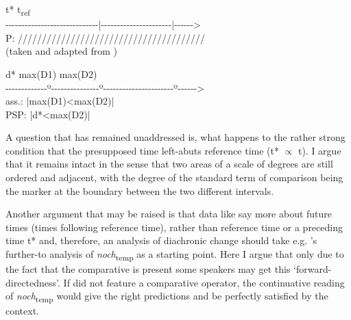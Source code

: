 \documentclass[output=paper
,modfonts
,nonflat]{langsci/langscibook}
\begin{document}
\ea\label{diagram_temp_comp}
\ea \noindent\parbox[t]{\linewidth}{\hspace{43pt} t* \hspace{80pt} t\textsubscript{ref}\\
{-}{-}{-}{-}{-}{-}{-}{-}{-}{-}{-}{-}{-}{-}{-}{-}{-}{-}{-}{-}{-}{-}{-}{-}{-}{-}{-}{-}{-}{|}{-}{-}{-}{-}{-}{-}{-}{-}{-}{-}{-}{-}{-}{-}{-}{-}{-}{-}{-}{-}{-}{-}{|}{-}{-}{-}{-}{-}{-}>\\
P: \hspace{40pt}///////////////////////////////////////\\ (taken and adapted from \citealt{beck2016a_sub})}
\ex \noindent\parbox[t]{\linewidth}{\hspace{43pt} d* \hspace{30pt} max(D1) \hspace{42pt} max(D2)\\
{-}{-}{-}{-}{-}{-}{-}{-}{-}{-}{-}{-}{-}{º}{-}{-}{-}{-}{-}{-}{-}{-}{-}{-}{-}{-}{-}{-}{-}{º}{-}{-}{-}{-}{-}{-}{-}{-}{-}{-}{-}{-}{-}{-}{-}{-}{-}{-}{-}{-}{-}{-}{º}{-}{-}{-}{-}{-}{-}>\\
ass.: \hspace{85pt}|\hspace{1.125pt}max(D1)<max(D2)\hspace{1.125pt}|\\
PSP: \hspace{25pt}|\hspace{1pt}d*<max(D2)\hspace{1pt}|}
\z\z


A question that has remained unaddressed is, what happens to the rather strong condition that the presupposed time left-abuts reference time (t* $\propto$ t). I argue that it remains intact in the sense that two areas of a scale of degrees are still ordered and adjacent, with the degree of the standard term of comparison being the marker at the boundary between the two different intervals.

Another argument that may be raised is that data like  say more about future times (times following reference time), rather than reference time or a preceding time t* and, therefore, an analysis of diachronic change should take e.g. \citeauthor{beck2016a_sub}'s \citeyearpar{beck2016a_sub} further-to analysis of \textit{noch}\textsubscript{temp} as a starting point. Here I argue that only due to the fact that the comparative is present some speakers may get this `forward-directedness'. If  did not feature a comparative operator, the continuative reading of \textit{noch}\textsubscript{temp} would give the right predictions and be perfectly satisfied by the context. 
\end{document}
